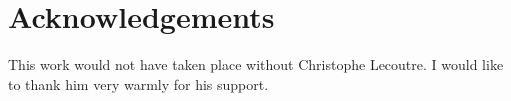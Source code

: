 \documentclass{llncs}
\begin{document}
\section*{Acknowledgements}
This work would not have taken place without Christophe
Lecoutre. I  would like to thank him  very warmly for his support.



\end{document}
